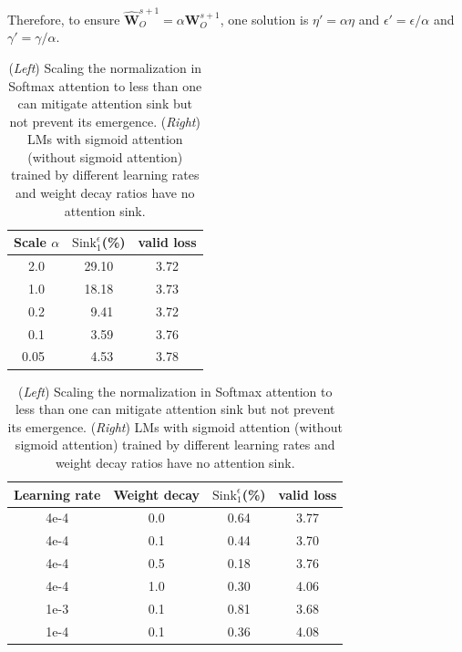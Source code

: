 Therefore, to ensure $\hat{\boldsymbol{W}}_O^{s+1}=\alpha\boldsymbol{W}_O^{s+1}$, one solution is $\eta'=\alpha\eta$ and $\epsilon'=\epsilon / \alpha$ and $\gamma'=\gamma / \alpha$.






\begin{table}[htbp]
\caption{(\emph{Left}) Scaling the normalization in Softmax attention to less than one can mitigate attention sink but not prevent its emergence. (\emph{Right}) LMs with sigmoid attention (without sigmoid attention) trained by different learning rates and weight decay ratios have no attention sink.}
\begin{minipage}[t]{0.38\linewidth}
\begin{center}
\begin{tabular}[t]{c|cc}
\toprule
Scale $\alpha$ &$\textrm{Sink}_1^{\epsilon}$(\%) & valid loss\\
\midrule
2.0 & 29.10 & 3.72\\
1.0 & 18.18 & 3.73\\
0.2 & \,\,\,9.41 & 3.72\\
0.1 & \,\,\,3.59 & 3.76\\
0.05\,\,\, & \,\,\,4.53 & 3.78 \\
\bottomrule
\end{tabular}
\end{center}
\end{minipage}
\hfill
\begin{minipage}[t]{0.60\linewidth}
\begin{center}
\begin{tabular}[t]{cc|cc}
\toprule
Learning rate & Weight decay & $\textrm{Sink}_1^{\epsilon}$(\%) & valid loss \\
\midrule
4e-4 & 0.0 & 0.64 & 3.77 \\
4e-4 & 0.1 & 0.44 & 3.70 \\
4e-4 & 0.5 & 0.18 & 3.76 \\
4e-4 & 1.0 & 0.30 & 4.06 \\
1e-3 & 0.1 & 0.81 & 3.68 \\
1e-4 & 0.1 & 0.36 & 4.08\\
\bottomrule
\end{tabular}
\end{center}
\end{minipage}
\label{reweight}
\end{table}

